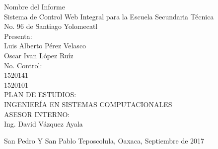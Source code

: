 \begin{figure}[h]
\begin{minipage}[r]{0.7\textwidth}
\begin{center}
		{\large Nombre del Informe}\\
		{\large Sistema de Control Web Integral para la Escuela Secundaria Técnica No. 96 de Santiago Yolomecatl}\\
		 \vspace{2cm}
	{\large Presenta: }\\
	{\large Luis Alberto P\'{e}rez Velasco}\\
	{\large Oscar Ivan L\'{o}pez Ru\'{i}z}\\ \vspace{1.5cm}		
	{\large No. Control:}\\
	{\large 1520141}\\
	{\large 1520101}\\ \vspace{1.5cm}
	{\large PLAN DE ESTUDIOS:}\\
	{\large INGENIER\'IA EN SISTEMAS COMPUTACIONALES}\\ 
	\vspace{2cm}
{\large ASESOR INTERNO: }\\
{\large Ing. David V\'{a}zquez Ayala}\\
\vspace{2.5cm}
	\begin{flushright}
	{\large San Pedro Y San Pablo Teposcolula, Oaxaca, Septiembre de 2017}\\
\end{flushright}
\end{center}
\end{minipage}
\end{figure}